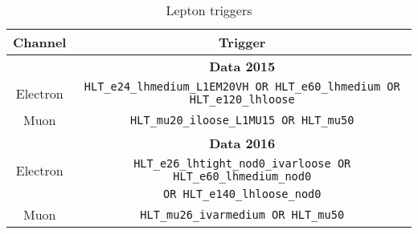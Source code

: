 %



\begin{table}[htpb]
  \caption{Lepton triggers}
  \small
  \begin{center}
    \begin{tabular}{c|c} \hline\hline
      Channel & Trigger \\  \hline
              & {\bf Data 2015} \\ \hline
      Electron & \verb+HLT_e24_lhmedium_L1EM20VH OR HLT_e60_lhmedium OR HLT_e120_lhloose+         \\ 
      Muon & \verb+HLT_mu20_iloose_L1MU15 OR HLT_mu50+ \\
      \hline
              & {\bf Data 2016} \\ \hline
      Electron & \verb+HLT_e26_lhtight_nod0_ivarloose OR HLT_e60_lhmedium_nod0+\\ 
               & \verb+OR HLT_e140_lhloose_nod0+         \\ 
      Muon & \verb+HLT_mu26_ivarmedium OR HLT_mu50+ \\
      \hline \hline
    \end{tabular}
  \end{center}
  \label{tb:lepTriggers}
\end{table}

